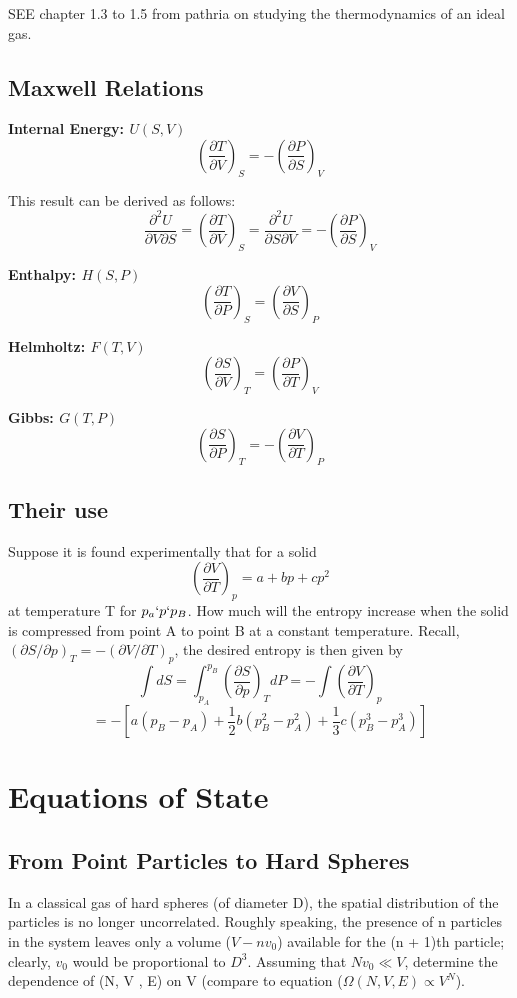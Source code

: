 \documentclass[10pt,twoside,openright]{memoir}
\begin{document}
SEE chapter 1.3 to 1.5 from pathria on studying the thermodynamics of an ideal gas.

\subsection{Maxwell Relations}

\textbf{Internal Energy: $U(S,V)$}
$$
\left( \frac{\partial T}{\partial V} \right)_{S} = - \left( \frac{\partial P}{\partial S} \right)_{V}
$$

This result can be derived as follows:
$$
\frac{\partial^2 U}{\partial V \partial S} =
\left( \frac{\partial T}{\partial V} \right)_S  
=
\frac{\partial^2 U}{\partial S \partial V} =
- \left( \frac{\partial P}{\partial S} \right)_V
$$

\textbf{Enthalpy: $H(S,P)$}
$$
\left( \frac{\partial T}{\partial P} \right)_{S} = \left( \frac{\partial V}{\partial S} \right)_{P}
$$

\textbf{Helmholtz: $F(T,V)$}
$$
\left( \frac{\partial S}{\partial V} \right)_{T} = \left( \frac{\partial P}{\partial T} \right)_{V}
$$

\textbf{Gibbs: $G(T,P)$}
$$
\left( \frac{\partial S}{\partial P} \right)_{T} = - \left( \frac{\partial V}{\partial T} \right)_{P}
$$


\subsection{Their use}
Suppose it is found experimentally that for a solid
$$
\left( \frac{\partial V}{\partial T} \right)_p = a + bp + cp^2
$$
at temperature T for $p_a \lq p \lq p_B$. How much will the entropy increase when the solid is compressed from point A to point B at a constant temperature.
Recall, $\left( \partial S / \partial p \right)_T = -\left( \partial V / \partial T \right)_p$, the desired entropy is then given by
$$
\int dS = \int_{p_A}^{p_B} \left( \frac{\partial S}{\partial p} \right)_T dP = - \int \left( \frac{\partial V}{\partial T} \right)_p
$$ 
$$
= - \left[ a(p_B - p_A) + \frac{1}{2}b(p_{B}^{2} - p_{A}^{2})  + \frac{1}{3}c(p_{B}^{3} - p_{A}^{3}) \right]
$$

\section{Equations of State}

\subsection{From Point Particles to Hard Spheres}
In a classical gas of hard spheres (of diameter D), the spatial distribution of the particles is no
longer uncorrelated. Roughly speaking, the presence of n particles in the system leaves only a volume ($V - nv_0$) available for the (n + 1)th particle; clearly, $v_0$ would be proportional to $D^3$. Assuming that $Nv_0 \ll V$, determine the dependence of (N, V , E) on V (compare to equation ($\Omega (N,V,E) \propto V^N$).
\end{document}

